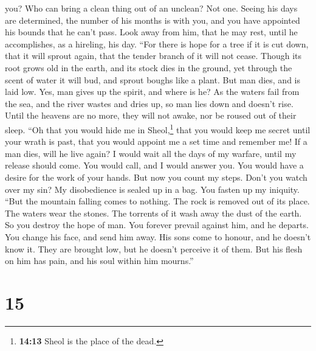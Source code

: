 you?  Who can bring a clean thing out of an unclean? Not
one.  Seeing his days are determined, the number of his
months is with you, and you have appointed his bounds that he can't
pass.  Look away from him, that he may rest, until he
accomplishes, as a hireling, his day.  ``For there is hope
for a tree if it is cut down, that it will sprout again, that the tender
branch of it will not cease.  Though its root grows old in
the earth, and its stock dies in the ground,  yet through
the scent of water it will bud, and sprout boughs like a plant.
 But man dies, and is laid low. Yes, man gives up the
spirit, and where is he?  As the waters fail from the
sea, and the river wastes and dries up,  so man lies down
and doesn't rise. Until the heavens are no more, they will not awake,
nor be roused out of their sleep.  ``Oh that you would
hide me in Sheol,\footnote{\textbf{14:13} Sheol is the place of the
  dead.} that you would keep me secret until your wrath is past, that
you would appoint me a set time and remember me!  If a
man dies, will he live again? I would wait all the days of my warfare,
until my release should come.  You would call, and I
would answer you. You would have a desire for the work of your hands.
 But now you count my steps. Don't you watch over my sin?
 My disobedience is sealed up in a bag. You fasten up my
iniquity.  ``But the mountain falling comes to nothing.
The rock is removed out of its place.  The waters wear
the stones. The torrents of it wash away the dust of the earth. So you
destroy the hope of man.  You forever prevail against
him, and he departs. You change his face, and send him away.
 His sons come to honour, and he doesn't know it. They
are brought low, but he doesn't perceive it of them.  But
his flesh on him has pain, and his soul within him mourns.''

\hypertarget{section-11}{%
\section{15}\label{section-11}}

